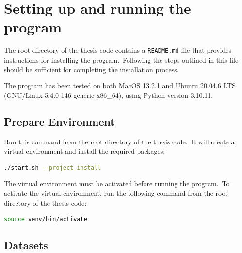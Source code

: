 \documentclass[../xlapes02]{subfiles}
\begin{document}


    \chapter{Setting up and running the program}\label{ch:setting-up-and-running-the-program}
    The root directory of the thesis code contains a \texttt{README.md} file that provides instructions for installing the program.\ Following the steps outlined in this file should be sufficient for completing the installation process.

    The program has been tested on both MacOS 13.2.1 and Ubuntu 20.04.6 LTS (GNU/Linux 5.4.0-146-generic x86\_64), using Python version 3.10.11.


    \section{Prepare Environment}\label{sec:prepare-environment}
    Run this command from the root directory of the thesis code.\ It will create a virtual environment and install the required packages:
    \begin{lstlisting}[language=bash,label={lst:prepare-environment}]
./start.sh --project-install
    \end{lstlisting}

    The virtual environment must be activated before running the program.\ To activate the virtual environment, run the following command from the root directory of the thesis code:
    \begin{lstlisting}[language=bash,label={lst:activate-venv}]
source venv/bin/activate
    \end{lstlisting}


    \section{Datasets}\label{sec:datasets2}
\end{document}
